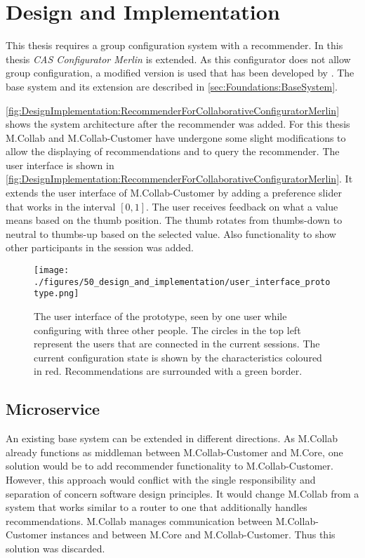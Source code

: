 \chapter{Design and Implementation}
\label{ch:DesignImplementation}

This thesis requires a group configuration system with a recommender. In this thesis \emph{CAS Configurator Merlin} \cite{IndustrySpecificProduct2020} is extended. As this configurator does not allow group configuration, a modified version is used that has been developed by \citeauthor{raabKollaborativeProduktkonfigurationEchtzeit2019} \cite{raabKollaborativeProduktkonfigurationEchtzeit2019}. The base system and its extension are described in \autoref{sec:Foundations:BaseSystem}.

\autoref{fig:DesignImplementation:RecommenderForCollaborativeConfiguratorMerlin} shows the system architecture after the recommender was added. For this thesis M.Collab and M.Collab-Customer have undergone some slight modifications to allow the displaying of recommendations and to query the recommender. The user interface is shown in \autoref{fig:DesignImplementation:RecommenderForCollaborativeConfiguratorMerlin}. It extends the user interface of M.Collab-Customer by adding a preference slider that works in the interval $[0,1]$. The user receives feedback on what a value means based on the thumb position. The thumb rotates from thumbs-down to neutral to thumbs-up based on the selected value. Also functionality to show other participants in the session was added.

\begin{figure}
    \centering
    \texttt{[image: ./figures/50\_design\_and\_implementation/user\_interface\_prototype.png]}
    \caption[User Interface]{The user interface of the prototype, seen by one user while configuring with three other people. The circles in the top left represent the users that are connected in the current sessions. The current configuration state is shown by the characteristics coloured in red. Recommendations are surrounded with a green border.}
    \label{fig:DesignImplementation:UserInterface}
\end{figure}


\section{Microservice}
\label{sec:DesignImplementation:Microservice}

An existing base system can be extended in different directions. As M.Collab already functions as middleman between M.Collab-Customer and M.Core, one solution would be to add recommender functionality to M.Collab-Customer. However, this approach would conflict with the single responsibility and separation of concern software design principles. It would change M.Collab from a system that works similar to a router to one that additionally handles  recommendations. M.Collab manages communication between M.Collab-Customer instances and between M.Core and M.Collab-Customer. Thus this solution was discarded.


